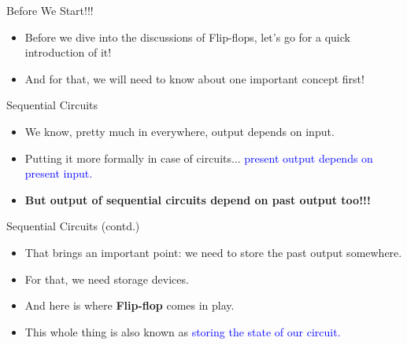 \begin{frame}{Before We Start!!!}
    \begin{itemize}
        \item Before we dive into the discussions of Flip-flops, let's go for a quick introduction of it!
        \pause
        \item And for that, we will need to know about one important concept first! 
    \end{itemize}
\end{frame}

\begin{frame}{Sequential Circuits}
    \begin{itemize}
        \item We know, pretty much in everywhere, output depends on input.
        \pause
        \item Putting it more formally in case of circuits... \textcolor{blue}{present output depends on present input.}
        \pause
        \item \textbf{But output of sequential circuits depend on past output too!!!}
    \end{itemize}
\end{frame}

\begin{frame}{Sequential Circuits (contd.)}
    \begin{itemize}
        \item That brings an important point: we need to \alert{store} the past output somewhere.
        \pause
        \item For that, we need storage devices. 
        \pause
        \item And here is where \textbf{Flip-flop} comes in play.
        \pause
        \item This whole thing is also known as \textcolor{blue}{storing the state of our circuit.}
    \end{itemize}
\end{frame}

